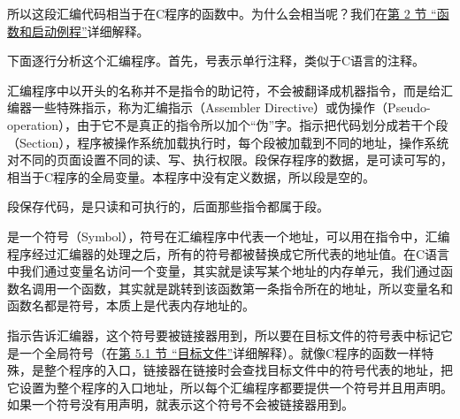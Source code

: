 

所以这段汇编代码相当于在C程序的函数中。为什么会相当呢？我们在\hyperlink{db.ch19s02.id2776173}{第 2 节 “函数和启动例程”}详细解释。



下面逐行分析这个汇编程序。首先，\BookCode{\#}号表示单行注释，类似于C语言的\BookCode{/\BookSplit{}/\BookSplit{}}注释。




汇编程序中以开头的名称并不是指令的助记符，不会被翻译成机器指令，而是给汇编器一些特殊指示，称为汇编指示（Assembler Directive）或伪操作（Pseudo-operation），由于它不是真正的指令所以加个“伪”字。指示把代码划分成若干个段（Section），程序被操作系统加载执行时，每个段被加载到不同的地址，操作系统对不同的页面设置不同的读、写、执行权限。段保存程序的数据，是可读可写的，相当于C程序的全局变量。本程序中没有定义数据，所以段是空的。




段保存代码，是只读和可执行的，后面那些指令都属于段。




是一个符号（Symbol），符号在汇编程序中代表一个地址，可以用在指令中，汇编程序经过汇编器的处理之后，所有的符号都被替换成它所代表的地址值。在C语言中我们通过变量名访问一个变量，其实就是读写某个地址的内存单元，我们通过函数名调用一个函数，其实就是跳转到该函数第一条指令所在的地址，所以变量名和函数名都是符号，本质上是代表内存地址的。



指示告诉汇编器，这个符号要被链接器用到，所以要在目标文件的符号表中标记它是一个全局符号（在\hyperlink{db.ch18s05.id2770854}{第 5.\BookSplit{}1 节 “目标文件”}详细解释）。就像C程序的函数一样特殊，是整个程序的入口，链接器在链接时会查找目标文件中的符号代表的地址，把它设置为整个程序的入口地址，所以每个汇编程序都要提供一个符号并且用声明。如果一个符号没有用声明，就表示这个符号不会被链接器用到。


